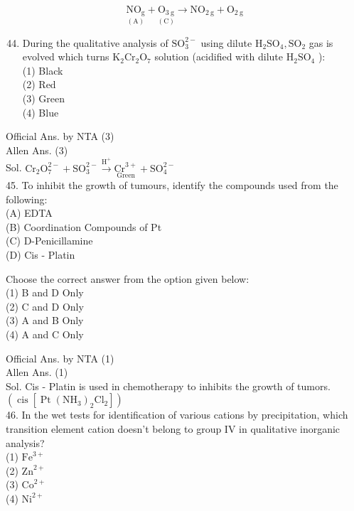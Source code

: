 \documentclass[10pt]{article}
\begin{document}
\[
\underset{(\mathrm{A})}{\mathrm{NO}_{\mathrm{g}}}+\underset{(\mathrm{C})}{\mathrm{O}_{3 \mathrm{~g}}} \longrightarrow \mathrm{NO}_{2 \mathrm{~g}}+\mathrm{O}_{2 \mathrm{~g}}
\]

\begin{enumerate}
  \setcounter{enumi}{43}
  \item During the qualitative analysis of \(\mathrm{SO}_{3}^{2-}\) using dilute \(\mathrm{H}_{2} \mathrm{SO}_{4}, \mathrm{SO}_{2}\) gas is evolved which turns \(\mathrm{K}_{2} \mathrm{Cr}_{2} \mathrm{O}_{7}\) solution (acidified with dilute \(\mathrm{H}_{2} \mathrm{SO}_{4}\) ):\\
(1) Black\\
(2) Red\\
(3) Green\\
(4) Blue
\end{enumerate}

Official Ans. by NTA (3)\\
Allen Ans. (3)\\
Sol. \(\mathrm{Cr}_{2} \mathrm{O}_{7}^{2-}+\mathrm{SO}_{3}^{2-} \xrightarrow{\mathrm{H}^{+}} \underset{\text { Green }}{\mathrm{Cr}^{3+}}+\mathrm{SO}_{4}^{2-}\)\\
45. To inhibit the growth of tumours, identify the compounds used from the following:\\
(A) EDTA\\
(B) Coordination Compounds of Pt\\
(C) D-Penicillamine\\
(D) Cis - Platin

Choose the correct answer from the option given below:\\
(1) B and D Only\\
(2) C and D Only\\
(3) A and B Only\\
(4) A and C Only

Official Ans. by NTA (1)\\
Allen Ans. (1)\\
Sol. Cis - Platin is used in chemotherapy to inhibits the growth of tumors. \(\left(\operatorname{cis}\left[\operatorname{Pt}\left(\mathrm{NH}_{3}\right)_{2} \mathrm{Cl}_{2}\right]\right)\)\\
46. In the wet tests for identification of various cations by precipitation, which transition element cation doesn't belong to group IV in qualitative inorganic analysis?\\
(1) \(\mathrm{Fe}^{3+}\)\\
(2) \(\mathrm{Zn}^{2+}\)\\
(3) \(\mathrm{Co}^{2+}\)\\
(4) \(\mathrm{Ni}^{2+}\)
\end{document}
